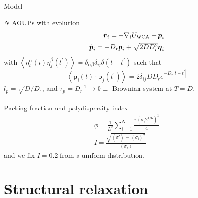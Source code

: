 \documentclass{beamer}
\begin{document}
\begin{frame}{Model}

$N$ AOUPs with evolution
\begin{eqnarray}
\dot{\boldsymbol{r}}_i = -\nabla_i U_{\rm WCA} + \boldsymbol{p}_i\\
\dot{\boldsymbol{p}}_i = - D_r \boldsymbol{p}_i + \sqrt{2 D D_r^2} \boldsymbol{\eta}_i
\end{eqnarray}
with $\left<\eta^{\alpha}_i(t)\eta^{\beta}_j(t^{\prime})\right> = \delta_{\alpha\beta} \delta_{ij} \delta(t - t^{\prime})$ such that
\begin{equation}
\left<\boldsymbol{p}_i(t) \cdot \boldsymbol{p}_j(t^{\prime})\right> = 2 \delta_{ij} D D_r e^{-D_r |t - t^{\prime}|}
\end{equation}
$l_p = \sqrt{D/D_r}$, and $\tau_p = D_r^{-1} \to 0 \equiv$ Brownian system at $T = D$.\\
\mbox{}\\

Packing fraction and polydispersity index
\begin{eqnarray}
\phi = \frac{1}{L^2} \sum_{i=1}^N \frac{\pi (\sigma_i 2^{1/6})^2}{4}\\
I = \frac{\sqrt{\left<\sigma_i^2\right> - \left<\sigma_i\right>^2}}{\left<\sigma_i\right>}
\end{eqnarray}
and we fix $I = 0.2$ from a uniform distribution.

\end{frame}

\section{Structural relaxation}
\end{document}

